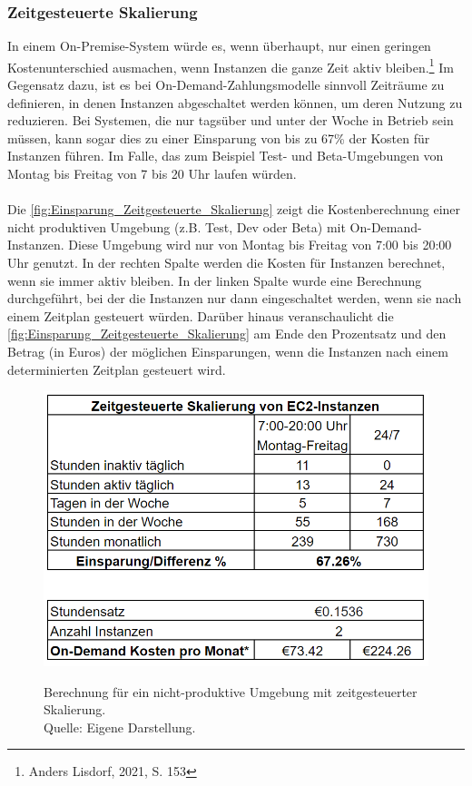 \subsubsection{Zeitgesteuerte Skalierung}\label{ssec:ZeitgesteuerteScal}
In einem On-Premise-System würde es, wenn überhaupt, nur einen geringen Kostenunterschied ausmachen, wenn Instanzen die ganze Zeit aktiv bleiben.\footnote{Anders Lisdorf, 2021, S. 153\cite{CCB}} %
Im Gegensatz dazu, ist es bei On-Demand-Zahlungsmodelle sinnvoll Zeiträume zu definieren, in denen Instanzen abgeschaltet werden können, um deren Nutzung zu reduzieren. Bei Systemen, die nur tagsüber und unter der Woche in Betrieb sein müssen, kann sogar dies zu einer Einsparung von bis zu 67\% der Kosten für Instanzen führen. Im Falle, das zum Beispiel Test- und Beta-Umgebungen von Montag bis Freitag von 7 bis 20 Uhr laufen würden. 
\\\\
Die \autoref{fig:Einsparung_Zeitgesteuerte_Skalierung} zeigt die Kostenberechnung einer nicht produktiven Umgebung (z.B. Test, Dev oder Beta) mit On-Demand-Instanzen. Diese Umgebung wird nur von Montag bis Freitag von 7:00 bis 20:00 Uhr genutzt. In der rechten Spalte werden die Kosten für Instanzen berechnet, wenn sie immer aktiv bleiben. In der linken Spalte wurde eine Berechnung durchgeführt, bei der die Instanzen nur dann eingeschaltet werden, wenn sie nach einem Zeitplan gesteuert würden. Darüber hinaus veranschaulicht die \autoref{fig:Einsparung_Zeitgesteuerte_Skalierung} am Ende den Prozentsatz und den Betrag (in Euros) der möglichen Einsparungen, wenn die Instanzen nach einem determinierten Zeitplan gesteuert wird.
\begin{figure}[h]
  \centering
  \includegraphics[scale=0.6]{sources/Einsparung_Zeitgesteuerte_Skalierung}
  \caption[Berechnung für ein nicht produktives Umgebung mit zeitgesteuerter Skalierung]{}
  \label{fig:Einsparung_Zeitgesteuerte_Skalierung} 
  Berechnung für ein nicht-produktive Umgebung mit zeitgesteuerter Skalierung. \\
  Quelle: Eigene Darstellung.
\end{figure}
